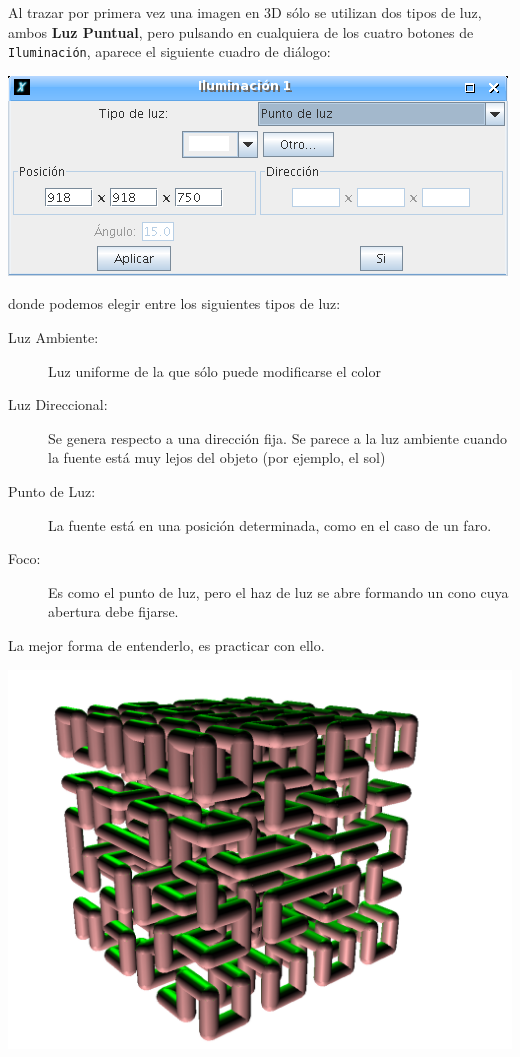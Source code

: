Al trazar por primera vez una imagen en 3D s\'olo se utilizan dos tipos de luz,
ambos \textbf{Luz Puntual}, pero pulsando en cualquiera de los cuatro botones de
\texttt{Iluminaci\'on}, aparece el siguiente cuadro de di\'alogo:
\begin{center}
   \includegraphics[scale=0.4]{Imagenes/05_Primitivas/Iluminacion1.png}
\end{center}
donde podemos elegir entre los siguientes tipos de luz:
\begin{description}
   \item[Luz Ambiente:] Luz uniforme de la que s\'olo puede modificarse el color
   \item[Luz Direccional:] Se genera respecto a una direcci\'on fija. Se parece a la
      luz ambiente cuando la fuente est\'a muy lejos del objeto (por ejemplo, el sol)
   \item[Punto de Luz:] La fuente est\'a en una posici\'on determinada, como en el
      caso de un faro.
   \item[Foco:] Es como el punto de luz, pero el haz de luz se abre formando un cono
      cuya abertura debe fijarse.
\end{description}
La mejor forma de entenderlo, es practicar con ello.
\begin{center}
   \includegraphics[scale=0.2]{Imagenes/05_Primitivas/hilbert.png}
\end{center}

